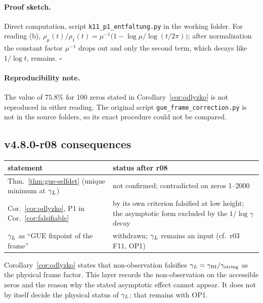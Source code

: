 \paragraph{Proof sketch.}
Direct computation, script \texttt{k11\_p1\_entfaltung.py} in the working folder.  For reading (b),
\(\rho_\mu(t)/\rho_1(t)=\mu^{-1}\bigl(1-\log\mu/\log(t/2\pi)\bigr)\); after normalization the constant
factor \(\mu^{-1}\) drops out and only the second term, which decays like \(1/\log t\), remains.
\(\square\)

\paragraph{Reproducibility note.}
The value of \(75.8\%\) for 100 zeros stated in Corollary~\ref{cor:odlyzko} is not reproduced in
either reading.  The original script \texttt{gue\_frame\_correction.py} is not in the source folders,
so its exact procedure could not be compared.

\subsection*{v4.8.0-r08 consequences}
\label{subsec:v480-r08-consequences}

\begin{center}
\small
\begin{tabular}{@{}>{\raggedright\arraybackslash}p{}>{\raggedright\arraybackslash}p{}@{}}
\toprule
statement & status after r08\\
\midrule
Thm.~\ref{thm:gue-selfdet} (unique minimum at \(\gamma_L\)) & not confirmed; contradicted on zeros 1--2000\\
Cor.~\ref{cor:odlyzko}, P1 in Cor.~\ref{cor:falsifiable} & by its own criterion falsified at low height; the asymptotic form excluded by the \(1/\log\gamma\) decay\\
\(\gamma_L\) as ``GUE fixpoint of the frame'' & withdrawn; \(\gamma_L\) remains an input (cf.\ r03 F11, OP1)\\
\bottomrule
\end{tabular}
\end{center}

Corollary~\ref{cor:odlyzko} states that non-observation falsifies \(\gamma_L=\gamma_{\mathrm{BI}}/\gamma_{\mathrm{string}}\) as the
physical frame factor.  This layer records the non-observation on the accessible zeros and the
reason why the stated asymptotic effect cannot appear.  It does not by itself decide the physical
status of \(\gamma_L\); that remains with OP1.

